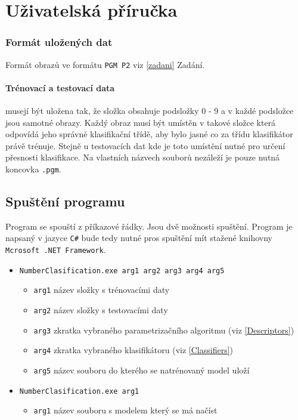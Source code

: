 \documentclass[12pt]{article}
\begin{document}
\section{Uživatelská příručka}

\subsubsection{Formát uložených dat}
Formát obrazů ve formátu \texttt{PGM P2} viz \ref{zadani} Zadání.

\paragraph{Trénovací a testovací data}
musejí být uložena tak, že složka obsahuje podsložky 0 - 9 a v každé podsložce jsou samotné obrazy. Každý obraz musí být umístěn v takové složce která odpovídá jeho správné klasifikační třídě, aby bylo jasné co za třídu klasifikátor právě trénuje. Stejně u testovacích dat kde je toto umístění nutné pro určení přesnosti klasifikace. Na vlastních názvech souborů nezáleží je pouze nutná koncovka \texttt{.pgm}.

\pagebreak

\subsection{Spuštění programu}
Program se spouští z příkazové řádky. Jsou dvě možnosti spuštění. Program je napsaný v jazyce \texttt{C\#} bude tedy nutné pros spuštění mít stažené knihovny \texttt{Mcrosoft .NET Framework}.

\begin{itemize}
\item \texttt{NumberClasification.exe arg1 arg2 arg3 arg4 arg5}
\begin{itemize}
\item \texttt{arg1} název složky s trénovacími daty
\item \texttt{arg2} název složky s testovacími daty
\item \texttt{arg3} zkratka vybraného parametrizačního algoritmu (viz \ref{Descriptors})
\item \texttt{arg4} zkratka vybraného klasifikátoru (viz \ref{Classifiers})
\item \texttt{arg5} název souboru do kterého se natrénovaný model uloží
\end{itemize}

\item \texttt{NumberClasification.exe arg1}
\begin{itemize}
\item \texttt{arg1} název souboru s modelem který se má načíst
\end{itemize}

\end{itemize}
\end{document}
